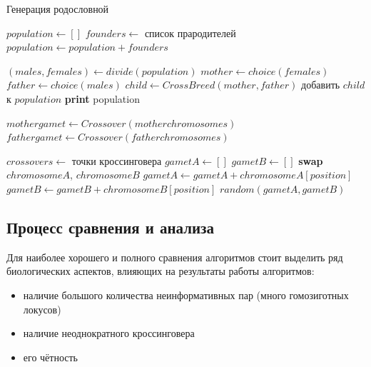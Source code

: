 \documentclass{matmex-diploma-custom}
\begin{document}
\begin{algorithm}
  \caption{Генерация родословной}
  \label{algo:pedogen}
  \begin{algorithmic}[1]
    \State $\mathit{population} \gets []$
    \State $\mathit{founders} \gets$ список прародителей
    \State $\mathit{population} \gets \mathit{population} + \mathit{founders}$

    \State $(\mathit{males}, \mathit{females}) \gets \mathit{divide}(\mathit{population})$
    \State $\mathit{mother} \gets \mathit{choice}(\mathit{females})$
    \State $\mathit{father} \gets \mathit{choice}(\mathit{males})$
    \State $\mathit{child} \gets \mathit{CrossBreed}(\mathit{mother}, \mathit{father})$
    \State добавить $\mathit{child}$ к $\mathit{population}$
    \EndFor
    \State \textbf{print} population
    \EndProcedure

    \State

    \State $\mathit{mother} \mathit{gamet} \gets \mathit{Crossover}(\mathit{mother} \mathit{chromosomes})$
    \State $\mathit{father} \mathit{gamet} \gets \mathit{Crossover}(\mathit{father} \mathit{chromosomes})$
    \EndFunction

    \State

    \State $\mathit{crossovers} \gets $ точки кроссинговера
    \State $\mathit{gametA} \gets []$
    \State $\mathit{gametB} \gets []$
    \State \textbf{swap} $\mathit{chromosomeA}$, $\mathit{chromosomeB}$
    \State $\mathit{gametA} \gets \mathit{gametA} + \mathit{chromosomeA}[\mathit{position}]$
    \State $\mathit{gametB} \gets \mathit{gametB} + \mathit{chromosomeB}[\mathit{position}]$
    \EndIf
    \EndFor
    \State \Return $\mathit{random}(\mathit{gametA}, \mathit{gametB})$
    \EndFunction
  \end{algorithmic}
\end{algorithm}

\subsection{Процесс сравнения и анализа}

Для наиболее хорошего и полного сравнения алгоритмов стоит выделить
ряд биологических аспектов, влияющих на результаты работы алгоритмов:
\begin{itemize}
\item наличие большого количества неинформативных пар (много
  гомозиготных локусов)
\item наличие неоднократного кроссинговера
\item его чётность
\end{itemize}
\end{document}
